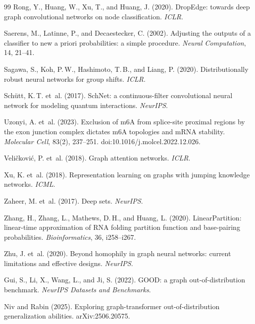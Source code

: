 \documentclass[11pt,a4paper]{article}
\begin{document}
\begin{thebibliography}{99}
    Rong, Y., Huang, W., Xu, T., and Huang, J. (2020).
    \newblock DropEdge: towards deep graph convolutional networks on node classification.
    \newblock \textit{ICLR}.

    Saerens, M., Latinne, P., and Decaestecker, C. (2002).
    \newblock Adjusting the outputs of a classifier to new a priori probabilities: a simple procedure.
    \newblock \textit{Neural Computation}, 14, 21--41.

    Sagawa, S., Koh, P.\,W., Hashimoto, T.\,B., and Liang, P. (2020).
    \newblock Distributionally robust neural networks for group shifts.
    \newblock \textit{ICLR}.

    Sch\"utt, K.\,T. et~al. (2017).
    \newblock SchNet: a continuous-filter convolutional neural network for modeling quantum interactions.
    \newblock \textit{NeurIPS}.

    Uzonyi, A. et~al. (2023).
    \newblock Exclusion of m6A from splice-site proximal regions by the exon junction complex dictates m6A topologies and mRNA stability.
    \newblock \textit{Molecular Cell}, 83(2), 237--251. doi:10.1016/j.molcel.2022.12.026.

    Veličković, P. et~al. (2018).
    \newblock Graph attention networks.
    \newblock \textit{ICLR}.

    Xu, K. et~al. (2018).
    \newblock Representation learning on graphs with jumping knowledge networks.
    \newblock \textit{ICML}.

    Zaheer, M. et~al. (2017).
    \newblock Deep sets.
    \newblock \textit{NeurIPS}.

    Zhang, H., Zhang, L., Mathews, D.\,H., and Huang, L. (2020).
    \newblock LinearPartition: linear-time approximation of RNA folding partition function and base-pairing probabilities.
    \newblock \textit{Bioinformatics}, 36, i258--i267.

    Zhu, J. et~al. (2020).
    \newblock Beyond homophily in graph neural networks: current limitations and effective designs.
    \newblock \textit{NeurIPS}.

    Gui, S., Li, X., Wang, L., and Ji, S. (2022).
    \newblock GOOD: a graph out-of-distribution benchmark.
    \newblock \textit{NeurIPS Datasets and Benchmarks}.

    Niv and Rabin (2025).
    \newblock Exploring graph-transformer out-of-distribution generalization abilities.
    \newblock arXiv:2506.20575.
\end{thebibliography}
\end{document}
